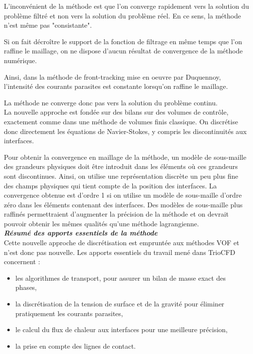L'inconv\'enient de la m\'ethode est que l'on converge rapidement vers la solution du problème filtr\'e
et non vers la solution du probl\`eme r\'eel.
En ce sens, la m\'ethode n'est m\^eme pas "consistante".

Si on fait d\'ecroître le support de la fonction de filtrage en m\^eme temps que l'on raffine le maillage,
on ne dispose d'aucun r\'esultat de convergence de la m\'ethode num\'erique.

Ainsi, dans la m\'ethode de front-tracking mise en oeuvre par Duquennoy,
l'intensit\'e des courants parasites est constante lorsqu'on raffine le maillage.

La m\'ethode ne converge donc pas vers la solution du probl\`eme continu.\\

La nouvelle approche est fond\'ee sur des bilans sur des volumes de contr\^ole,
exactement comme dans une m\'ethode de volumes finis classique.
On discr\'etise donc directement les \'equations de Navier-Stokes, y compris les discontinuit\'es aux interfaces.

Pour obtenir la convergence en maillage de la m\'ethode, un mod\`ele de sous-maille des grandeurs physiques
doit \^etre introduit dans les \'el\'ements o\`u ces grandeurs sont discontinues.
Ainsi, on utilise une repr\'esentation discr\`ete un peu plus fine des champs physiques
qui tient compte de la position des interfaces.
La convergence obtenue est d'ordre 1 si on utilise un mod\`ele de sous-maille d'ordre z\'ero
dans les \'el\'ements contenant des interfaces.
Des mod\`eles de sous-maille plus raffin\'es permettraient d'augmenter la pr\'ecision de la m\'ethode
et on devrait pouvoir obtenir les m\^emes qualit\'es qu'une m\'ethode lagrangienne.
\smallskip \\

\textit{\textbf{R\'esum\'e des apports essentiels de la m\'ethode}}
\smallskip \\

Cette nouvelle approche de discr\'etisation est emprunt\'ee aux m\'ethodes VOF
et n'est donc pas nouvelle.
Les apports essentiels du travail men\'e dans TrioCFD concernent :
\begin{itemize}
  \item les algorithmes de transport, pour assurer un bilan de masse exact des phases,
  \item la discr\'etisation de la tension de surface
        et de la gravit\'e pour \'eliminer pratiquement les courants parasites,
  \item le calcul du flux de chaleur aux interfaces pour une meilleure pr\'ecision,\\
  \item la prise en compte des lignes de contact.
\end{itemize}

